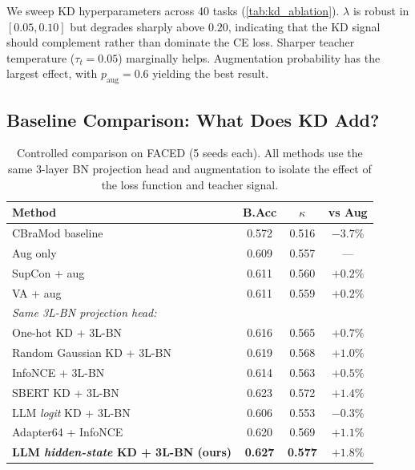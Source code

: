 We sweep KD hyperparameters across 40 tasks (\cref{tab:kd_ablation}). $\lambda$ is robust in $[0.05, 0.10]$ but degrades sharply above $0.20$, indicating that the KD signal should complement rather than dominate the CE loss. Sharper teacher temperature ($\tau_t = 0.05$) marginally helps. Augmentation probability has the largest effect, with $p_{\text{aug}} = 0.6$ yielding the best result.

\subsection{Baseline Comparison: What Does KD Add?}
\label{sec:baseline_ablation}
\vspace{-1mm}

\begin{table}[!t]
\caption{Controlled comparison on FACED (5 seeds each). All methods use the same 3-layer BN projection head and augmentation to isolate the effect of the loss function and teacher signal.}
\small
\centering
\setlength{\tabcolsep}{5pt}
\begin{tabular}{lccc}
\toprule
Method & B.Acc & $\kappa$ & vs Aug \\
\midrule
CBraMod baseline & 0.572 & 0.516 & $-3.7\%$ \\
Aug only & 0.609 & 0.557 & --- \\
SupCon + aug & 0.611 & 0.560 & $+0.2\%$ \\
VA + aug & 0.611 & 0.559 & $+0.2\%$ \\
\midrule
\multicolumn{4}{l}{\textit{Same 3L-BN projection head:}} \\
One-hot KD + 3L-BN & 0.616 & 0.565 & $+0.7\%$ \\
Random Gaussian KD + 3L-BN & 0.619 & 0.568 & $+1.0\%$ \\
InfoNCE + 3L-BN & 0.614 & 0.563 & $+0.5\%$ \\
SBERT KD + 3L-BN & 0.623 & 0.572 & $+1.4\%$ \\
LLM \emph{logit} KD + 3L-BN & 0.606 & 0.553 & $-0.3\%$ \\
Adapter64 + InfoNCE & 0.620 & 0.569 & $+1.1\%$ \\
\rowcolor{blond}
\textbf{LLM \emph{hidden-state} KD + 3L-BN (ours)} & \textbf{0.627} & \textbf{0.577} & $\mathbf{+1.8\%}$ \\
\bottomrule
\end{tabular}
\label{tab:baselines}
\end{table}

